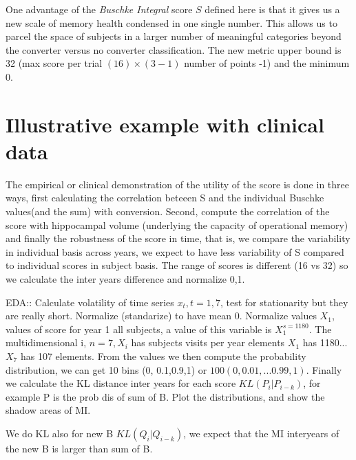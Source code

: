 \documentclass[9pt,twocolumn,twoside]{pnas-new}
\begin{document}
One advantage of the \emph{Buschke Integral} score $S$ defined here is that it gives us a new scale of memory health condensed in one single number. This allows us to parcel the space of subjects in a larger number of meaningful categories beyond the converter versus no converter classification. The new metric upper bound is 32 (max score per trial $(16)\times (3-1)$ number of points -1) and the minimum 0.


\section*{Illustrative example with clinical data}
The empirical or clinical demonstration of the utility of the score is done in three ways, first calculating the correlation beteeen S and the individual Buschke values(and the sum) with conversion. Second, compute the correlation of the score with hippocampal volume (underlying the capacity of operational memory) and finally the robustness of the score in time, that is, we compare the variability in individual basis across years, we expect to have less variability of S compared to individual scores in subject basis. The range of scores is different (16 vs 32) so we calculate the inter years difference and normalize 0,1.


EDA:: Calculate volatility of time series $x_t , t=1,7$, test for stationarity but they are really short.
Normalize (standarize) to have mean 0. Normalize values $X_{1}$, values of score for year 1 all subjects, a value of this variable is $X^{s=1180}_{1}$. The multidimensional i, $n=7, X_{i}$ has subjects visits per year elements $X_1$ has 1180... $X_7$ has 107 elements. From the values we then compute the probability distribution, we can get 10 bins (0, 0.1,0.9,1) or $100 (0,0.01,...0.99,1)$. Finally we calculate the KL distance inter years for each score $KL(P_i| P_{i-k})$, for example P is the prob dis of sum of B. Plot the distributions, and show the shadow areas of MI.

We do KL also for new B $KL(Q_i| Q_{i-k})$, we expect that the MI interyears of the new B is larger than sum of B.
\end{document}
